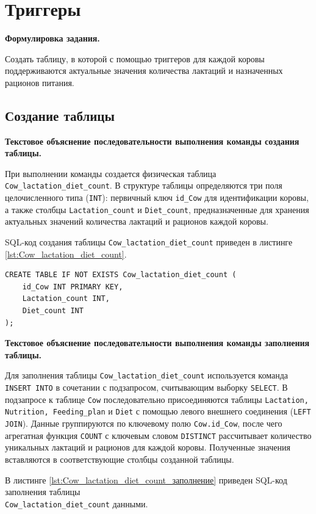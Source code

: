\section{Триггеры}
\textbf{Формулировка задания.}

Создать таблицу, в которой с помощью триггеров для каждой коровы
поддерживаются актуальные значения количества лактаций и назначенных рационов питания.

\subsection{Создание таблицы}
\textbf{Текстовое объяснение последовательности выполнения команды создания таблицы.}

При выполнении команды создается физическая таблица \\\texttt{Cow\_lactation\_diet\_count}.
В структуре таблицы определяются три поля целочисленного типа (\texttt{INT}):
первичный ключ \texttt{id\_Cow} для идентификации коровы,
а также столбцы \texttt{Lactation\_count} и \texttt{Diet\_count},
предназначенные для хранения актуальных значений количества лактаций и рационов
каждой коровы.

SQL-код создания таблицы \texttt{Cow\_lactation\_diet\_count} приведен в листинге
\ref{lst:Cow_lactation_diet_count}.

\begin{lstlisting}[caption={Создание таблицы Cow\_lactation\_diet\_count}, label={lst:Cow_lactation_diet_count}]
CREATE TABLE IF NOT EXISTS Cow_lactation_diet_count (
    id_Cow INT PRIMARY KEY,
    Lactation_count INT,
    Diet_count INT
);
\end{lstlisting}

\textbf{Текстовое объяснение последовательности выполнения команды заполнения таблицы.}

Для заполнения таблицы \texttt{Cow\_lactation\_diet\_count}
используется команда \texttt{INSERT INTO} в сочетании с подзапросом, считывающим выборку 
\texttt{SELECT}.
В подзапросе к таблице \texttt{Cow} последовательно присоединяются таблицы
\texttt{Lactation, Nutrition, Feeding\_plan} и \texttt{Diet} с помощью
левого внешнего соединения (\texttt{LEFT JOIN}).
Данные группируются по ключевому полю \texttt{Cow.id\_Cow},
после чего агрегатная функция \texttt{COUNT} с ключевым словом \texttt{DISTINCT} рассчитывает количество уникальных лактаций и рационов для каждой коровы. Полученные значения вставляются в соответствующие столбцы созданной таблицы.

В листинге \ref{lst:Cow_lactation_diet_count_заполнение}
приведен SQL-код заполнения таблицы \\\texttt{Cow\_lactation\_diet\_count} данными.

